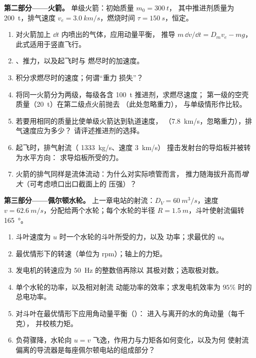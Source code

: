 \begin{problem}
\medskip
\noindent\textbf{第二部分——火箭。}
单级火箭：初始质量 $m_0 = \qty{300}{t}$，
其中推进剂质量为 \qty{200}{t}，排气速度 $v_e = \qty{3.0}{km/s}$，燃烧时间 $\tau =
\qty{150}{s}$，恒定。
\begin{enumerate}[resume]
  \item 对火箭加上 $\dd t$ 内喷出的气体，应用动量平衡，
        推导 $m\,\dd v/\dd t = D_mv_e - mg$，
        此式适用于竖直飞行。
  \item {}、推力，以及起飞时与
        燃尽时的加速度。
  \item 积分求燃尽时的速度；何谓“重力
        损失”？
  \item 将同一火箭分为两级，每级各含 \qty{100}{t} 推进剂，求燃尽速度；
        第一级的空壳质量（\qty{20}{t}）在第二级点火前抛去
        （此处忽略重力），
        与单级情形作比较。
  \item 若要用相同的质量比使单级火箭达到轨道速度，
        （\qty{7.8}{km/s}，忽略重力），排气速度应为多少？
        请评述推进剂的选择。
  \item 起飞时，排气射流（ \qty{1333}{kg/s}、速度 \qty{3}{km/s}）
        撞击发射台的导焰板并被转为水平方向：
        求导焰板所受的力。
  \item 火箭的排气同样是流体流动：为什么对实际喷管而言，
        推力随海拔升高而\emph{增大}（可考虑喷口出口截面上的
        压强）？
\end{enumerate}

\medskip
\noindent\textbf{第三部分——佩尔顿水轮。}
上一章电站的射流：$D_V = \qty{60}{m^3/s}$，速度 $v =
\qty{62.6}{m/s}$，分配给两个水轮；每个水轮的半径 $R =
\qty{1.5}{m}$，斗叶使射流偏转 \qty{165}{\degree}。
\begin{enumerate}[resume]
  \item 斗叶速度为 $u$ 时一个水轮的斗叶所受的力，以及
        功率；求最优的 $u$。
  \item 最优情形下的转速（单位为 rpm）；轴上的力矩。
  \item 发电机的转速应为 \qty{50}{Hz} 的整数倍再除以
        其极对数；选取极对数。
  \item 单个水轮的功率，以及相对射流
        动能功率的效率；求发电机效率为 $95\%$ 时的
        总电功率。
  \item 对斗叶在最优情形下应用角动量平衡（）：
        进入与离开的水的角动量（每千克），
        并校核力矩。
  \item 负荷骤降，水轮向 $u =
        v$ 飞逸，作用力与力矩各如何变化，以及为何
        使射流偏离的导流器是每座佩尔顿电站的组成部分？
\end{enumerate}


\end{problem}
